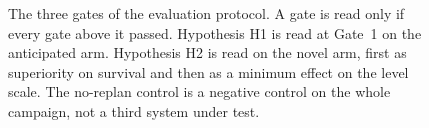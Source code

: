 \begin{figure}[htbp]
\caption[The three gates of the evaluation protocol]{The three gates of the
evaluation protocol. A gate is read only if every gate above it passed.
Hypothesis H1 is read at Gate~1 on the anticipated arm. Hypothesis H2 is read
on the novel arm, first as superiority on survival and then as a minimum effect
on the level scale. The no-replan control is a negative control on the whole
campaign, not a third system under test.}
\label{fig:eval:gates}
\end{figure}
